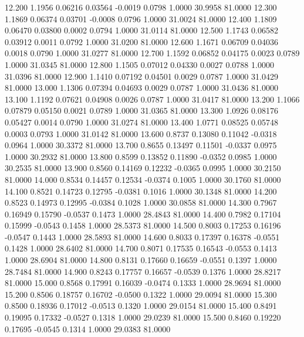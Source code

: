   12.200   1.1956   0.06216   0.03564  -0.0019   0.0798   1.0000  30.9958  81.0000
  12.300   1.1869   0.06374   0.03701  -0.0008   0.0796   1.0000  31.0024  81.0000
  12.400   1.1809   0.06470   0.03800   0.0002   0.0794   1.0000  31.0114  81.0000
  12.500   1.1743   0.06582   0.03912   0.0011   0.0792   1.0000  31.0200  81.0000
  12.600   1.1671   0.06709   0.04036   0.0018   0.0790   1.0000  31.0277  81.0000
  12.700   1.1592   0.06852   0.04175   0.0023   0.0789   1.0000  31.0345  81.0000
  12.800   1.1505   0.07012   0.04330   0.0027   0.0788   1.0000  31.0396  81.0000
  12.900   1.1410   0.07192   0.04501   0.0029   0.0787   1.0000  31.0429  81.0000
  13.000   1.1306   0.07394   0.04693   0.0029   0.0787   1.0000  31.0436  81.0000
  13.100   1.1192   0.07621   0.04908   0.0026   0.0787   1.0000  31.0417  81.0000
  13.200   1.1066   0.07879   0.05150   0.0021   0.0789   1.0000  31.0365  81.0000
  13.300   1.0926   0.08176   0.05427   0.0014   0.0790   1.0000  31.0274  81.0000
  13.400   1.0771   0.08525   0.05748   0.0003   0.0793   1.0000  31.0142  81.0000
  13.600   0.8737   0.13080   0.11042  -0.0318   0.0964   1.0000  30.3372  81.0000
  13.700   0.8655   0.13497   0.11501  -0.0337   0.0975   1.0000  30.2932  81.0000
  13.800   0.8599   0.13852   0.11890  -0.0352   0.0985   1.0000  30.2535  81.0000
  13.900   0.8560   0.14169   0.12232  -0.0365   0.0995   1.0000  30.2150  81.0000
  14.000   0.8534   0.14457   0.12534  -0.0374   0.1005   1.0000  30.1760  81.0000
  14.100   0.8521   0.14723   0.12795  -0.0381   0.1016   1.0000  30.1348  81.0000
  14.200   0.8523   0.14973   0.12995  -0.0384   0.1028   1.0000  30.0858  81.0000
  14.300   0.7967   0.16949   0.15790  -0.0537   0.1473   1.0000  28.4843  81.0000
  14.400   0.7982   0.17104   0.15999  -0.0543   0.1458   1.0000  28.5373  81.0000
  14.500   0.8003   0.17253   0.16196  -0.0547   0.1443   1.0000  28.5893  81.0000
  14.600   0.8033   0.17397   0.16378  -0.0551   0.1428   1.0000  28.6402  81.0000
  14.700   0.8071   0.17535   0.16543  -0.0553   0.1413   1.0000  28.6904  81.0000
  14.800   0.8131   0.17660   0.16659  -0.0551   0.1397   1.0000  28.7484  81.0000
  14.900   0.8243   0.17757   0.16657  -0.0539   0.1376   1.0000  28.8217  81.0000
  15.000   0.8568   0.17991   0.16039  -0.0474   0.1333   1.0000  28.9694  81.0000
  15.200   0.8506   0.18757   0.16702  -0.0500   0.1322   1.0000  29.0094  81.0000
  15.300   0.8500   0.18936   0.17012  -0.0513   0.1320   1.0000  29.0154  81.0000
  15.400   0.8491   0.19095   0.17332  -0.0527   0.1318   1.0000  29.0239  81.0000
  15.500   0.8460   0.19220   0.17695  -0.0545   0.1314   1.0000  29.0383  81.0000
